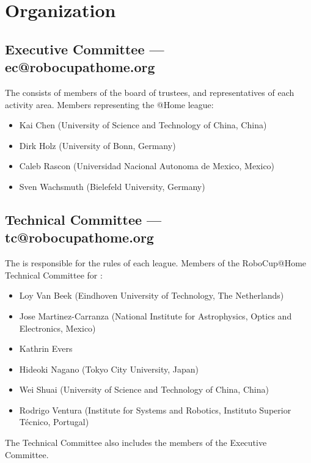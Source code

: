 \section{Organization}

\subsection{Executive Committee --- ec@robocupathome.org}
\label{sec:ec}
The  consists of members of the board of trustees, and representatives of each activity area. Members representing the @Home league:
\begin{itemize}
  \item Kai Chen (University of Science and Technology of China, China)
  \item Dirk Holz (University of Bonn, Germany)
  \item Caleb Rascon (Universidad Nacional Autonoma de Mexico, Mexico)
  \item Sven Wachsmuth (Bielefeld University, Germany)
\end{itemize}

\subsection{Technical Committee --- tc@robocupathome.org}
\label{sec:tc}
The  is responsible for the rules of each league. Members of the RoboCup@Home Technical Committee for \YEAR:
\begin{itemize}
  \item Loy Van Beek (Eindhoven University of Technology, The Netherlands)
  \item Jose Martinez-Carranza (National Institute for Astrophysics, Optics and Electronics, Mexico)
  \item Kathrin Evers
  \item Hideoki Nagano (Tokyo City University, Japan)
  \item Wei Shuai (University of Science and Technology of China, China)
  \item Rodrigo Ventura (Institute for Systems and Robotics, Instituto Superior Técnico, Portugal)
\end{itemize}
The Technical Committee also includes the members of the Executive Committee.

